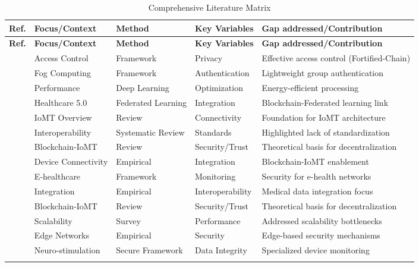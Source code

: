 \documentclass[12pt, a4paper]{report}
\begin{document}
\renewcommand{\arraystretch}{1.5}
\begin{longtable}{|>{\centering\arraybackslash}p{0.7cm}|>{\centering\arraybackslash}p{2.7cm}|>{\centering\arraybackslash}p{2.7cm}|>{\centering\arraybackslash}p{2.7cm}|>{\centering\arraybackslash}p{4.5cm}|}
    
    \hline
    \rowcolor{myblue!20} \bfseries Ref. & \bfseries Focus/Context & \bfseries Method & \bfseries Key Variables & \bfseries Gap addressed/Contribution \tabularnewline \hline
    \endfirsthead

    \hline
    \rowcolor{myblue!20} \bfseries Ref. & \bfseries Focus/Context & \bfseries Method & \bfseries Key Variables & \bfseries Gap addressed/Contribution \tabularnewline \hline
    \endhead

    \cite{ref1} & Access Control & Framework & Privacy & Effective access control (Fortified-Chain) \tabularnewline \hline
    \cite{ref2} & Fog Computing & Framework & Authentication & Lightweight group authentication \tabularnewline \hline
    \cite{ref3} & Performance & Deep Learning & Optimization & Energy-efficient processing \tabularnewline \hline
    \cite{ref4} & Healthcare 5.0 & Federated Learning & Integration & Blockchain-Federated learning link \tabularnewline \hline
    \cite{ref5} & IoMT Overview & Review & Connectivity & Foundation for IoMT architecture \tabularnewline \hline
    \cite{ref6} & Interoperability & Systematic Review & Standards & Highlighted lack of standardization \tabularnewline \hline
    \cite{ref7} & Blockchain-IoMT & Review & Security/Trust & Theoretical basis for decentralization \tabularnewline \hline
    \cite{ref8} & Device Connectivity & Empirical & Integration & Blockchain-IoMT enablement \tabularnewline \hline
    \cite{ref9} & E-healthcare & Framework & Monitoring & Security for e-health networks \tabularnewline \hline
    \cite{ref10} & Integration & Empirical & Interoperability & Medical data integration focus \tabularnewline \hline
    \cite{ref11} & Blockchain-IoMT & Review & Security/Trust & Theoretical basis for decentralization \tabularnewline \hline
    \cite{ref12} & Scalability & Survey & Performance & Addressed scalability bottlenecks \tabularnewline \hline
    \cite{ref13} & Edge Networks & Empirical & Security & Edge-based security mechanisms \tabularnewline \hline
    \cite{ref14} & Neuro-stimulation & Secure Framework & Data Integrity & Specialized device monitoring \tabularnewline \hline
    
    \caption{Comprehensive Literature Matrix}
    \label{tab:Literature_Matrix}
\end{longtable}
\end{document}
